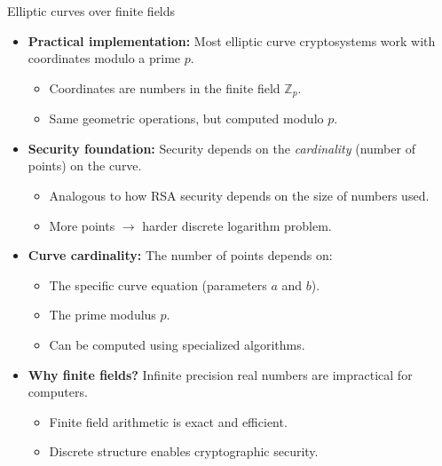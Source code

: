 \documentclass[aspectratio=169, lualatex, handout]{beamer}
\begin{document}
\begin{frame}{Elliptic curves over finite fields}
	\begin{itemize}
		\item \textbf{Practical implementation:} Most elliptic curve cryptosystems work with coordinates modulo a prime $p$.
		      \begin{itemize}
			      \item Coordinates are numbers in the finite field $\mathbb{Z}_p$.
			      \item Same geometric operations, but computed modulo $p$.
		      \end{itemize}
		\item \textbf{Security foundation:} Security depends on the \emph{cardinality} (number of points) on the curve.
		      \begin{itemize}
			      \item Analogous to how RSA security depends on the size of numbers used.
			      \item More points $\rightarrow$ harder discrete logarithm problem.
		      \end{itemize}
		\item \textbf{Curve cardinality:} The number of points depends on:
		      \begin{itemize}
			      \item The specific curve equation (parameters $a$ and $b$).
			      \item The prime modulus $p$.
			      \item Can be computed using specialized algorithms.
		      \end{itemize}
		\item \textbf{Why finite fields?} Infinite precision real numbers are impractical for computers.
		      \begin{itemize}
			      \item Finite field arithmetic is exact and efficient.
			      \item Discrete structure enables cryptographic security.
		      \end{itemize}
	\end{itemize}
\end{frame}
\end{document}
